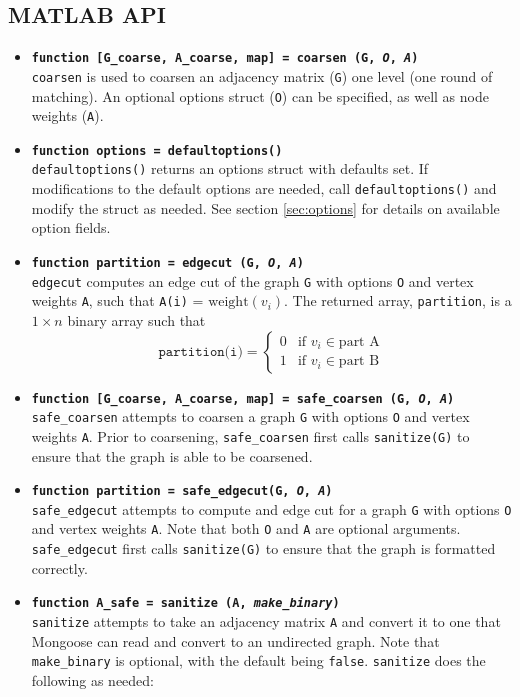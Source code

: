 \documentclass[letter]{article}
\begin{document}
\subsection{MATLAB API}

\begin{itemize}
\item \textbf{\texttt{function [G\_coarse, A\_coarse, map] = coarsen (G, \textit{O}, \textit{A})}}\\
\texttt{coarsen} is used to coarsen an adjacency matrix (\texttt{G}) one level (one round of matching). An optional options struct (\texttt{O}) can be specified, as well as node weights (\texttt{A}).
\\
\item \textbf{\texttt{function options = defaultoptions()}}\\
\texttt{defaultoptions()} returns an options struct with defaults set. If modifications to the default options are needed, call \texttt{defaultoptions()} and modify the struct as needed. See section \ref{sec:options} for details on available option fields.
\\
\item \textbf{\texttt{function partition = edgecut (G, \textit{O}, \textit{A})}}\\
\texttt{edgecut} computes an edge cut of the graph \texttt{G} with options \texttt{O} and vertex weights \texttt{A}, such that \texttt{A(i)} = $\text{weight}(v_i)$. The returned array, \texttt{partition}, is a $1 \times n$ binary array such that
\[
\texttt{partition(i)} = 
  \begin{cases} 
   0 & \text{if } v_i \in \text{part A} \\
   1 & \text{if } v_i \in \text{part B}
  \end{cases}
\]
\item \textbf{\texttt{function [G\_coarse, A\_coarse, map] = safe\_coarsen (G, \textit{O}, \textit{A})}}\\
\texttt{safe\_coarsen} attempts to coarsen a graph \texttt{G} with options \texttt{O} and vertex weights \texttt{A}. Prior to coarsening, \texttt{safe\_coarsen} first calls \texttt{sanitize(G)} to ensure that the graph is able to be coarsened.
\\
\item \textbf{\texttt{function partition = safe\_edgecut(G, \textit{O}, \textit{A})}}\\
\texttt{safe\_edgecut} attempts to compute and edge cut for a graph \texttt{G} with options \texttt{O} and vertex weights \texttt{A}. Note that both \texttt{O} and \texttt{A} are optional arguments. \texttt{safe\_edgecut} first calls \texttt{sanitize(G)} to ensure that the graph is formatted correctly.
\\ 
\item \textbf{\texttt{function A\_safe = sanitize (A, \textit{make\_binary})}}\\
\texttt{sanitize} attempts to take an adjacency matrix \texttt{A} and convert it to one that Mongoose can read and convert to an undirected graph. Note that \texttt{make\_binary} is optional, with the default being \texttt{false}. \texttt{sanitize} does the following as needed:


\end{itemize}
\end{document}
